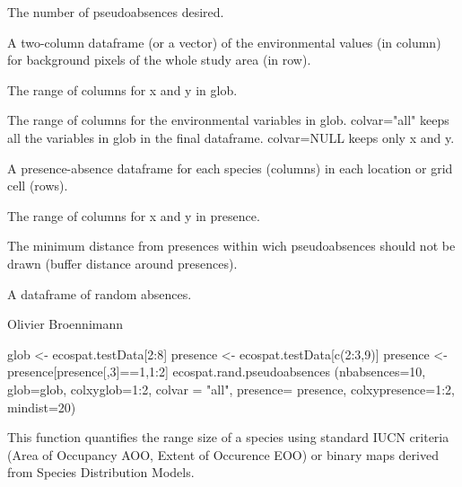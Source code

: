 \documentclass[a4paper]{book}
\begin{document}
\begin{Arguments}
\begin{ldescription}
\item[\code{nbabsences}] The number of pseudoabsences desired.
\item[\code{glob}] A two-column dataframe (or a vector) of the environmental values (in column) for background pixels of the whole study area (in row).
\item[\code{colxyglob}] The range of columns for x and y in glob.
\item[\code{colvar}] The range of columns for the environmental variables in glob. colvar="all" keeps all the variables in glob in the final dataframe. colvar=NULL keeps only x and y.
\item[\code{presence}] A presence-absence dataframe for each species (columns) in each location or grid cell (rows).
\item[\code{colxypresence}] The range of columns for x and y in presence.
\item[\code{mindist}] The minimum distance from presences within wich pseudoabsences should not be drawn (buffer distance around presences).
\end{ldescription}
\end{Arguments}
%
\begin{Value}
A dataframe of random absences.
\end{Value}
%
\begin{Author}\relax
Olivier Broennimann 
\end{Author}
%
\begin{Examples}
\begin{ExampleCode}
glob <- ecospat.testData[2:8]
presence <- ecospat.testData[c(2:3,9)]
presence <- presence[presence[,3]==1,1:2]
ecospat.rand.pseudoabsences (nbabsences=10, glob=glob, colxyglob=1:2, colvar = "all", 
presence= presence, colxypresence=1:2, mindist=20)
\end{ExampleCode}
\end{Examples}
%
\begin{Description}\relax
This function quantifies the range size of a species using standard IUCN criteria (Area of Occupancy AOO, Extent of Occurence EOO) or binary maps derived from Species Distribution Models.
\end{Description}
\end{document}
